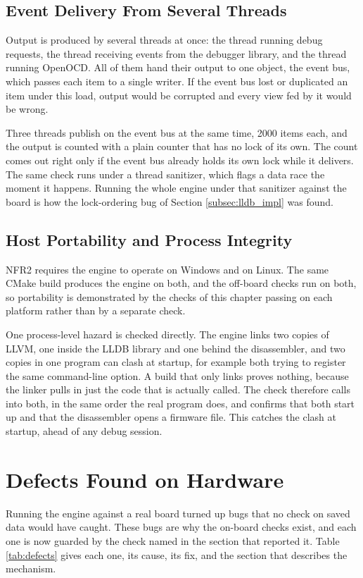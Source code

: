 \subsection{Event Delivery From Several Threads}
\label{subsec:val_eventbus}
Output is produced by several threads at once: the thread running debug requests, the thread receiving events from the debugger library, and the thread running OpenOCD. All of them hand their output to one object, the event bus, which passes each item to a single writer. If the event bus lost or duplicated an item under this load, output would be corrupted and every view fed by it would be wrong.

Three threads publish on the event bus at the same time, 2000 items each, and the output is counted with a plain counter that has no lock of its own. The count comes out right only if the event bus already holds its own lock while it delivers. The same check runs under a thread sanitizer, which flags a data race the moment it happens. Running the whole engine under that sanitizer against the board is how the lock-ordering bug of Section \ref{subsec:lldb_impl} was found.

\subsection{Host Portability and Process Integrity}
\label{subsec:val_portability}
NFR2 requires the engine to operate on Windows and on Linux. The same CMake build produces the engine on both, and the off-board checks run on both, so portability is demonstrated by the checks of this chapter passing on each platform rather than by a separate check.

One process-level hazard is checked directly. The engine links two copies of LLVM, one inside the LLDB library and one behind the disassembler, and two copies in one program can clash at startup, for example both trying to register the same command-line option. A build that only links proves nothing, because the linker pulls in just the code that is actually called. The check therefore calls into both, in the same order the real program does, and confirms that both start up and that the disassembler opens a firmware file. This catches the clash at startup, ahead of any debug session.


\section{Defects Found on Hardware}
\label{subsec:field_issues}
Running the engine against a real board turned up bugs that no check on saved data would have caught. These bugs are why the on-board checks exist, and each one is now guarded by the check named in the section that reported it. Table \ref{tab:defects} gives each one, its cause, its fix, and the section that describes the mechanism.

